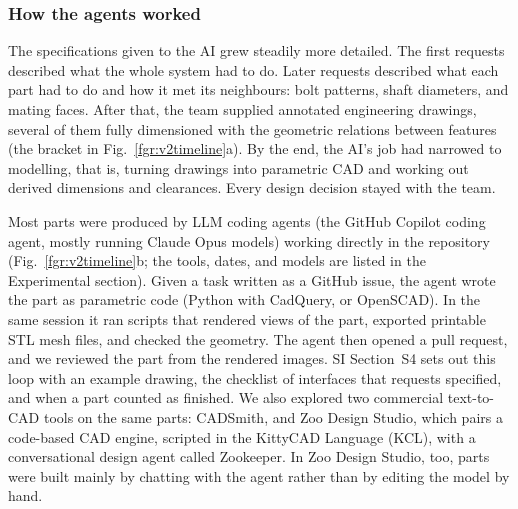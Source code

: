 \documentclass[twoside,twocolumn,9pt]{article}
\begin{document}
\subsubsection{How the agents worked}
The specifications given to the AI grew steadily more detailed. The first requests described what the whole system had to do. Later requests described what each part had to do and how it met its neighbours: bolt patterns, shaft diameters, and mating faces. After that, the team supplied annotated engineering drawings, several of them fully dimensioned with the geometric relations between features (the bracket in Fig.~\ref{fgr:v2timeline}a). By the end, the AI's job had narrowed to modelling, that is, turning drawings into parametric CAD and working out derived dimensions and clearances. Every design decision stayed with the team.

Most parts were produced by LLM coding agents (the GitHub Copilot coding agent, mostly running Claude Opus models) working directly in the repository (Fig.~\ref{fgr:v2timeline}b; the tools, dates, and models are listed in the Experimental section). Given a task written as a GitHub issue, the agent wrote the part as parametric code (Python with CadQuery, or OpenSCAD). In the same session it ran scripts that rendered views of the part, exported printable STL mesh files, and checked the geometry. The agent then opened a pull request, and we reviewed the part from the rendered images. SI Section~S4 sets out this loop with an example drawing, the checklist of interfaces that requests specified, and when a part counted as finished. We also explored two commercial text-to-CAD tools on the same parts: CADSmith, and Zoo Design Studio, which pairs a code-based CAD engine, scripted in the KittyCAD Language (KCL), with a conversational design agent called Zookeeper. In Zoo Design Studio, too, parts were built mainly by chatting with the agent rather than by editing the model by hand.
\end{document}
